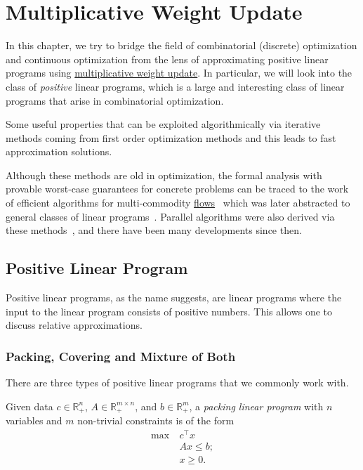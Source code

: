 \chapter{Multiplicative Weight Update}\label{ch:MWU}
In this chapter, we try to bridge the field of combinatorial (discrete) optimization and continuous optimization from the lens of approximating positive linear programs using \hyperref[algo:MWU-discrete-non-uniform]{multiplicative weight update}. In particular, we will look into the class of \emph{positive} linear programs, which is a large and interesting class of linear programs that arise in combinatorial optimization.

\begin{intuition}
	Some useful properties that can be exploited algorithmically via iterative methods coming from first order optimization methods and this leads to fast approximation solutions.
\end{intuition}

Although these methods are old in optimization, the formal analysis with provable worst-case guarantees for concrete problems can be traced to the work of efficient algorithms for multi-commodity \hyperref[def:flow]{flows}~\cite{shahrokhi1990maximum} which was later abstracted to general classes of linear programs~\cite{plotkin1995fast,grigoriadis1994fast}. Parallel algorithms were also derived via these methods~\cite{luby1993parallel}, and there have been many developments since then.

\section{Positive Linear Program}
Positive linear programs, as the name suggests, are linear programs where the input to the linear program consists of positive numbers. This allows one to discuss relative approximations.

\subsection{Packing, Covering and Mixture of Both}
There are three types of positive linear programs that we commonly work with.

\begin{definition}\label{def:packing-LP}
	Given data \(c \in \mathbb{R} _{+}^n\), \(A \in \mathbb{R} _{+}^{m \times n}\), and \(b \in \mathbb{R} _{+}^m\), a \emph{packing linear program} with \(n\) variables and \(m\) non-trivial constraints is of the form
	\[
		\begin{aligned}
			\max~ & c^{\top} x  \\
			      & Ax \leq b ; \\
			      & x \geq 0.
		\end{aligned}
	\]
\end{definition}

